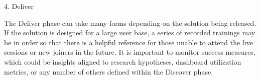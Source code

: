 \documentclass[]{book}
\begin{document}
4. Deliver

The Deliver phase can take many forms depending on the solution being released. If the solution is designed for a large user base, a series of recorded trainings may be in order so that there is a helpful reference for those unable to attend the live sessions or new joiners in the future. It is important to monitor success measures, which could be insights aligned to research hypotheses, dashboard utilization metrics, or any number of others defined within the Discover phase.


\end{document}
